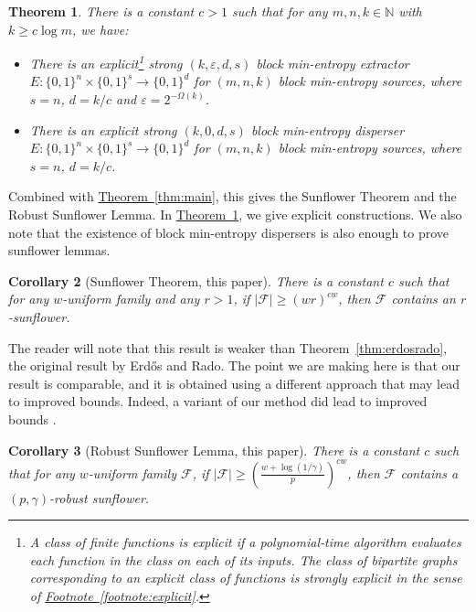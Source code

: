 \documentclass[11pt]{article}
\numberwithin{equation}{section}
\newtheorem{theorem}{Theorem}[section]
\newtheorem{corollary}[theorem]{Corollary}
\theoremstyle{definition}
\theoremstyle{plain}
\newcommand{\expref}[2]{\hyperref[#2]{#1~\ref{#2}}}
\newcommand{\nnn}{\mathbb{N}}   %
\newcommand{\eps}{\varepsilon}
\newcommand{\calF}{\mathcal{F}} %
\begin{document}
\begin{theorem}\label{thm:extractor}
There is a constant $c>1$ such that for any $m, n, k \in \nnn$ with $k \geq c \log m$, we have:
\begin{itemize}
%
%
\item There is an explicit\footnote{\label{footnote:expl}
A class of finite functions is
\emph{explicit} if a polynomial-time algorithm evaluates
each function in the class on each of its inputs.
The class of bipartite graphs corresponding
to an explicit class of functions is strongly explicit in the sense
of \expref{Footnote}{footnote:explicit}.}
strong $(k,\eps,d,s)$ block min-entropy extractor $E:\{0,1\}^{n}\times\{0,1\}^{s}\rightarrow\{0,1\}^{d}$
for $(m, n, k)$ block min-entropy sources, where $s=n$, $d=k/c$ and $\eps=2^{-\Omega(k)}$.

\item There is an explicit strong $(k,0,d,s)$ block min-entropy disperser $E:\{0,1\}^{n}\times\{0,1\}^{s}\rightarrow\{0,1\}^{d}$ for $(m, n, k)$
block min-entropy sources, where $s=n$, $d=k/c$.
\end{itemize}
\end{theorem}

\noindent Combined with \expref{Theorem}{thm:main}, this gives the Sunflower Theorem and the Robust Sunflower Lemma. In \expref{Theorem}{thm:extractor}, we %
give  %
explicit constructions.  %
We also note that the existence of block min-entropy dispersers is
 also enough to prove sunflower lemmas.

\begin{corollary}[Sunflower Theorem, this paper] \label{thm:sunflower}
There is a constant %
$c$   %
such that for any
%
$w$-uniform family  %
and any $r>1$, if $|\calF|\geq (wr)^{c w} $, then $\calF$
contains %
an   %
$r$-sunflower.
\end{corollary}

%
The reader will note that this result is weaker than
Theorem~\ref{thm:erdosrado}, the original result by Erd\H{o}s and Rado.
The point we are making here is that our result is comparable,
and it is obtained using a different approach that may lead to
improved bounds.  Indeed, a variant of our method did lead to
improved bounds \cite{alweiss2020improved, rao2020coding}.
%
%
%

\begin{corollary}[Robust Sunflower Lemma, this paper] \label{thm:quasi}
There is a constant $c$
such that for any $w$-uniform family $\calF$, 
if $|\calF|\geq \left(\frac{w+\log(1/\gamma)}{p}\right)^{cw}$,
then $\calF$ contains a $(p, \gamma)$-robust sunflower.
\end{corollary}
\end{document}
